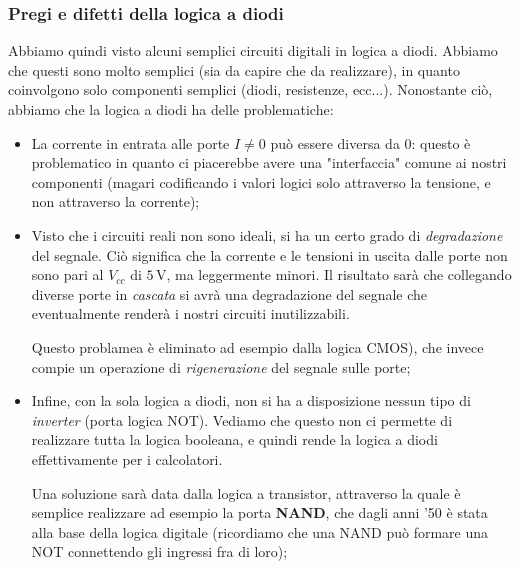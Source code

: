 \documentclass[a4paper,11pt]{article}
\begin{document}
\subsubsection{Pregi e difetti della logica a diodi}
Abbiamo quindi visto alcuni semplici circuiti digitali in logica a diodi. Abbiamo che questi sono molto semplici (sia da capire che da realizzare), in quanto coinvolgono solo componenti semplici (diodi, resistenze, ecc...). Nonostante ciò, abbiamo che la logica a diodi ha delle problematiche:
\begin{itemize}
	\item La corrente in entrata alle porte $I \neq 0$ può essere diversa da 0: questo è problematico in quanto ci piacerebbe avere una "interfaccia" comune ai nostri componenti (magari codificando i valori logici solo attraverso la tensione, e non attraverso la corrente);
	\item Visto che i circuiti reali non sono ideali, si ha un certo grado di \textit{degradazione} del segnale. Ciò significa che la corrente e le tensioni in uscita dalle porte non sono pari al $V_{cc}$ di $5 \, \mathrm{V}$, ma leggermente minori. Il risultato sarà che collegando diverse porte in \textit{cascata} si avrà una degradazione del segnale che eventualmente renderà i nostri circuiti inutilizzabili. 

		Questo problamea è eliminato ad esempio dalla logica CMOS), che invece compie un operazione di \textit{rigenerazione} del segnale sulle porte;
	\item Infine, con la sola logica a diodi, non si ha a disposizione nessun tipo di \textit{inverter} (porta logica NOT). Vediamo che questo non ci permette di realizzare tutta la logica booleana, e quindi rende la logica a diodi effettivamente per i calcolatori.

		Una soluzione sarà data dalla logica a transistor, attraverso la quale è semplice realizzare ad esempio la porta \textbf{NAND}, che dagli anni '50 è stata alla base della logica digitale (ricordiamo che una NAND può formare una NOT connettendo gli ingressi fra di loro);
\end{itemize}
\end{document}
